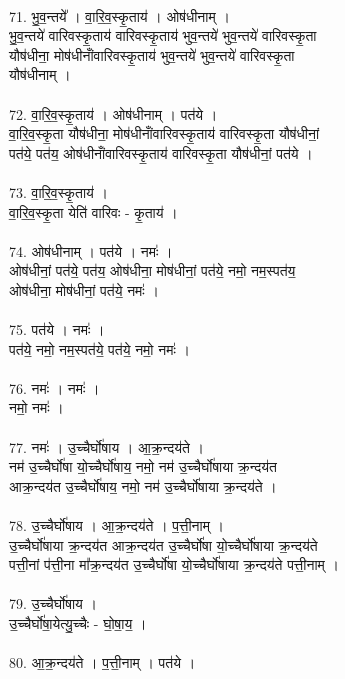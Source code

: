 \\
71. भु॒व॒न्तये᳚ । वा॒रि॒व॒स्कृ॒ताय॑ । ओष॑धीनाम् ।\\
भु॒व॒न्तये॑ वारिवस्कृ॒ताय॑ वारिवस्कृ॒ताय॑ भुव॒न्तये॑ भुव॒न्तये॑ वारिवस्कृ॒ता\\
यौष॑धीना॒ मोष॑धीनांँवारिवस्कृ॒ताय॑ भुव॒न्तये॑ भुव॒न्तये॑ वारिवस्कृ॒ता\\
यौष॑धीनाम् ।\\
\\
72. वा॒रि॒व॒स्कृ॒ताय॑ । ओष॑धीनाम् । पत॑ये ।\\
वा॒रि॒व॒स्कृ॒ता यौष॑धीना॒ मोष॑धीनांँवारिवस्कृ॒ताय॑ वारिवस्कृ॒ता यौष॑धीनां॒\\
पत॑ये॒ पत॑य॒ ओष॑धीनांँवारिवस्कृ॒ताय॑ वारिवस्कृ॒ता यौष॑धीनां॒ पत॑ये ।\\
\\
73. वा॒रि॒व॒स्कृ॒ताय॑ ।\\
वा॒रि॒व॒स्कृ॒ता येति॑ वारिवः - कृ॒ताय॑ ।\\
\\
74. ओष॑धीनाम् । पत॑ये । नमः॑ ।\\
ओष॑धीनां॒ पत॑ये॒ पत॑य॒ ओष॑धीना॒ मोष॑धीनां॒ पत॑ये॒ नमो॒ नम॒स्पत॑य॒\\
ओष॑धीना॒ मोष॑धीनां॒ पत॑ये॒ नमः॑ ।\\
\\
75. पत॑ये । नमः॑ ।\\
पत॑ये॒ नमो॒ नम॒स्पत॑ये॒ पत॑ये॒ नमो॒ नमः॑ ।\\
\\
76. नमः॑ । नमः॑ ।\\
नमो॒ नमः॑ ।\\
\\
77. नमः॑ । उ॒च्चैर्घो॑षाय । आ॒क्र॒न्दय॑ते ।\\
नम॑ उ॒च्चैर्घो॑षा यो॒च्चैर्घो॑षाय॒ नमो॒ नम॑ उ॒च्चैर्घो॑षाया क्र॒न्दय॑त\\
आक्र॒न्दय॑त उ॒च्चैर्घो॑षाय॒ नमो॒ नम॑ उ॒च्चैर्घो॑षाया क्र॒न्दय॑ते ।\\
\\
78. उ॒च्चैर्घो॑षाय । आ॒क्र॒न्दय॑ते । प॒त्ती॒नाम् ।\\
उ॒च्चैर्घो॑षाया क्र॒न्दय॑त आक्र॒न्दय॑त उ॒च्चैर्घो॑षा यो॒च्चैर्घो॑षाया क्र॒न्दय॑ते\\
पत्ती॒नां प॑त्ती॒ना मा᳚क्र॒न्दय॑त उ॒च्चैर्घो॑षा यो॒च्चैर्घो॑षाया क्र॒न्दय॑ते पत्ती॒नाम् ।\\
\\
79. उ॒च्चैर्घो॑षाय ।\\
उ॒च्चैर्घो॑षा॒येत्यु॒च्चैः - घो॒षा॒य॒ ।\\
\\
80. आ॒क्र॒न्दय॑ते । प॒त्ती॒नाम् । पत॑ये ।\\
